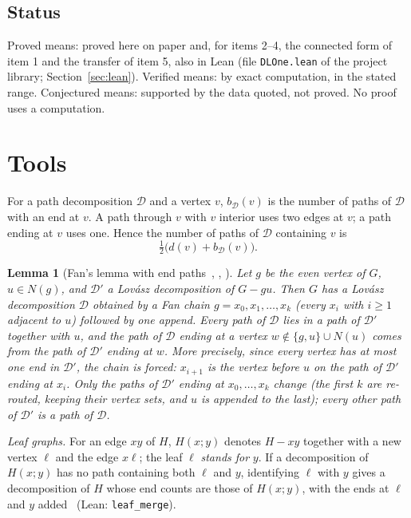 \documentclass[11pt]{amsart}
\newtheorem{lemma}[theorem]{Lemma}
\theoremstyle{definition}
\newcommand{\cD}{\mathcal D}
\begin{document}
\subsection*{Status}
Proved means: proved here on paper and, for items 2--4, the connected form of item 1 and the
transfer of item 5, also in Lean (file \texttt{DLOne.lean} of the project library;
Section~\ref{sec:lean}). Verified means: by exact computation,
in the stated range. Conjectured means: supported by the data quoted, not proved. No proof uses a
computation.

\section{Tools}\label{sec:tools}

For a path decomposition $\cD$ and a vertex $v$, $b_\cD(v)$ is the number of paths of $\cD$ with an
end at $v$. A path through $v$ with $v$ interior uses two edges at $v$; a path ending at $v$ uses one.
Hence the number of paths of $\cD$ containing $v$ is
\begin{equation}\label{eq:count}
\tfrac12\bigl(d(v)+b_\cD(v)\bigr).
\end{equation}

\begin{lemma}[Fan's lemma with end paths~{\cite{Fan05}, \cite[Lemma~2.2]{RD}, \cite[Theorem ``Fan with end paths'']{CLT}}]
\label{lem:fan}
Let $g$ be the even vertex of $G$, $u\in N(g)$, and $\cD'$ a Lov\'asz decomposition of $G-gu$. Then
$G$ has a Lov\'asz decomposition $\cD$ obtained by a Fan chain $g=x_0,x_1,\dots,x_k$ (every $x_i$
with $i\ge1$ adjacent to $u$) followed by one append. Every path of $\cD$ lies in a path of $\cD'$
together with $u$, and the path of $\cD$ ending at a vertex $w\notin\{g,u\}\cup N(u)$ comes from the
path of $\cD'$ ending at $w$. More precisely, since every vertex has at most one end in $\cD'$, the
chain is forced: $x_{i+1}$ is the vertex before $u$ on the path of $\cD'$ ending at $x_i$. Only the paths
of $\cD'$ ending at $x_0,\dots,x_k$ change (the first $k$ are re-routed, keeping their vertex sets,
and $u$ is appended to the last); every other path of $\cD'$ is a path of $\cD$.
\end{lemma}

\emph{Leaf graphs.} For an edge $xy$ of $H$, $H(x;y)$ denotes $H-xy$ together with a new vertex
$\ell$ and the edge $x\ell$; the leaf $\ell$ \emph{stands for} $y$. If a decomposition of $H(x;y)$
has no path containing both $\ell$ and $y$, identifying $\ell$ with $y$ gives a decomposition of $H$
whose end counts are those of $H(x;y)$, with the ends at $\ell$ and $y$ added~\cite[Lemma~12]{MS}
(Lean: \texttt{leaf\_merge}).
\end{document}
